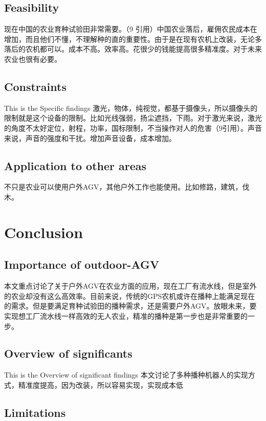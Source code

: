 \documentclass[12pt]{article}
\begin{document}
\begin{flushleft}
\subsection{Feasibility}
现在中国的农业育种试验田非常需要。（9 引用）中国农业落后，雇佣农民成本在增加，而且他们不懂，不理解种的直的重要性。由于是在现有农机上改装，无论多落后的农机都可以。成本不高。效率高。花很少的钱能提高很多精准度。对于未来农业也很有必要。

\subsection{Constraints}
This is the Specific findings
激光，物体，纯视觉，都基于摄像头，所以摄像头的限制就是这个设备的限制。比如光线强弱，扬尘遮挡，下雨。对于激光来说，激光的角度不太好定位，射程，功率，国标限制，不当操作对人的危害（9引用）。声音来说，声音的强度和干扰。增加声音设备，成本增加。

\subsection{Application to other areas}
不只是农业可以使用户外AGV，其他户外工作也能使用。比如修路，建筑，伐木。

\section{Conclusion}

\subsection{Importance of outdoor-AGV}
本文重点讨论了关于户外AGV在农业方面的应用，现在工厂有流水线，但是室外的农业却没有这么高效率。目前来说，传统的GPS农机或许在播种上能满足现在的需求。但是要满足育种试验田的播种需求，还是需要户外AGV。放眼未来，要实现想工厂流水线一样高效的无人农业，精准的播种是第一步也是非常重要的一步。

\subsection{Overview of significants}
This is the Overview of significant findings
本文讨论了多种播种机器人的实现方式，精准度提高，因为改装，所以容易实现，实现成本低

\subsection{Limitations}


\end{flushleft}
\end{document}

